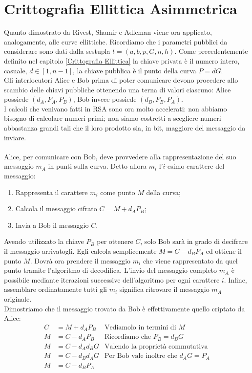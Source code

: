 \documentclass[a4paper,12pt]{tesiinfo}
\begin{document}
\section{Crittografia Ellittica Asimmetrica}
Quanto dimostrato da Rivest, Shamir e Adleman viene ora applicato, analogamente, alle curve ellittiche. Ricordiamo che i parametri pubblici da considerare sono dati dalla sestupla $t= (a, b, p, G, n, h)$. Come precedentemente definito nel capitolo \ref{Crittografia Ellittica} la chiave privata \`e il numero intero, casuale, $d \in [1, n-1]$, la chiave pubblica \`e il punto della curva $P = dG$. 
\\
Gli interlocutori Alice e Bob prima di poter comunicare devono procedere allo scambio delle chiavi pubbliche ottenendo una terna di valori ciascuno: Alice possiede $(d_A, P_A, P_B)$, Bob invece possiede $(d_B, P_B, P_A)$. 
\\
I calcoli che venivano fatti in RSA sono ora molto accelerati: non abbiamo bisogno di calcolare numeri primi; non siamo costretti a scegliere numeri abbastanza grandi tali che il loro prodotto sia, in bit, maggiore del messaggio da inviare.
\\
\\
Alice, per comunicare con Bob, deve provvedere alla rappresentazione del suo messaggio $m_A$ in punti sulla curva. Detto allora $m_i$ l'$i$-esimo carattere del messaggio:
\begin{enumerate}
 \item Rappresenta il carattere $m_i$ come punto $M$ della curva;
 \item Calcola il messaggio cifrato $C = M + d_AP_B$;
 \item Invia a Bob il messaggio $C$.
\end{enumerate}
Avendo utilizzato la chiave $P_B$ per ottenere $C$, solo Bob sar\`a in grado di decifrare il messaggio arrivatogli. Egli calcola semplicemente $M = C - d_BP_A$ ed ottiene il punto $M$. Dovr\`a ora prendere il messaggio $m_i$ che viene rappresentato da quel punto tramite l'algoritmo di decodifica. L'invio del messaggio completo $m_A$ \`e possibile mediante iterazioni successive dell'algoritmo per ogni carattere $i$. Infine, assemblare ordinatamente tutti gli $m_i$ significa ritrovare il messaggio $m_A$ originale.
\\
Dimostriamo che il messaggio trovato da Bob \`e effettivamente quello criptato da Alice:
\begin{align*}
    C &= M + d_AP_B &\text{Vediamolo in termini di $M$}\\
    M &= C - d_AP_B &\text{Ricordiamo che }P_B=d_BG\\
    M &= C - d_Ad_BG &\text{Valendo la propriet\`a commutativa}\\
    M &= C - d_Bd_AG &\text{Per Bob vale inoltre che }d_AG = P_A\\
    M &= C - d_BP_A 
\end{align*}
\end{document}
